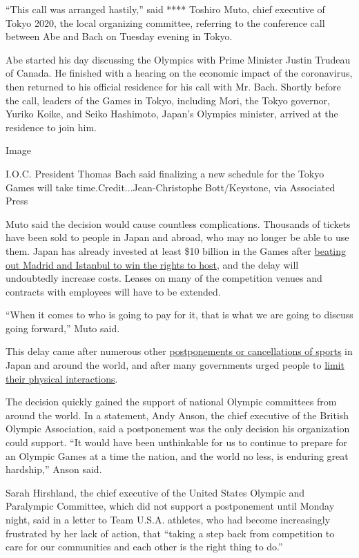 ``This call was arranged hastily,'' said **** Toshiro Muto, chief
executive of Tokyo 2020, the local organizing committee, referring to
the conference call between Abe and Bach on Tuesday evening in Tokyo.

Abe started his day discussing the Olympics with Prime Minister Justin
Trudeau of Canada. He finished with a hearing on the economic impact of
the coronavirus, then returned to his official residence for his call
with Mr. Bach. Shortly before the call, leaders of the Games in Tokyo,
including Mori, the Tokyo governor, Yuriko Koike, and Seiko Hashimoto,
Japan's Olympics minister, arrived at the residence to join him.

Image

I.O.C. President Thomas Bach said finalizing a new schedule for the
Tokyo Games will take time.Credit...Jean-Christophe Bott/Keystone, via
Associated Press

Muto said the decision would cause countless complications. Thousands of
tickets have been sold to people in Japan and abroad, who may no longer
be able to use them. Japan has already invested at least \$10 billion in
the Games after
\href{https://www.nytimes.com/2013/09/08/sports/olympics/tokyo-wins-bid-for-2020-olympics.html}{beating
out Madrid and Istanbul to win the rights to host}, and the delay will
undoubtedly increase costs. Leases on many of the competition venues and
contracts with employees will have to be extended.

``When it comes to who is going to pay for it, that is what we are going
to discuss going forward,'' Muto said.

This delay came after numerous other
\href{https://www.nytimes.com/2020/03/12/sports/coronavirus-sports-canceled.html?searchResultPosition=4}{postponements
or cancellations of sports} in Japan and around the world, and after
many governments urged people to
\href{https://www.nytimes.com/2020/03/23/well/family/coronavirus-loneliness-isolation-social-distancing-elderly.html}{limit
their physical interactions}.

The decision quickly gained the support of national Olympic committees
from around the world. In a statement, Andy Anson, the chief executive
of the British Olympic Association, said a postponement was the only
decision his organization could support. ``It would have been
unthinkable for us to continue to prepare for an Olympic Games at a time
the nation, and the world no less, is enduring great hardship,'' Anson
said.

Sarah Hirshland, the chief executive of the United States Olympic and
Paralympic Committee, which did not support a postponement until Monday
night, said in a letter to Team U.S.A. athletes, who had become
increasingly frustrated by her lack of action, that ``taking a step back
from competition to care for our communities and each other is the right
thing to do.''

